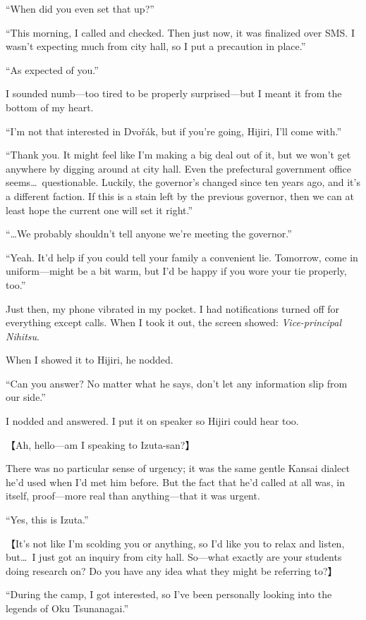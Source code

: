 \documentclass[
    a4paper,
    12pt,
    twoside,
    openany,
    UTF8,
    fontset=windows
]{ctexbook}
\begin{document}
``When did you even set that up?''

``This morning, I called and checked. Then just now, it was finalized over SMS. I wasn't expecting much from city hall, so I put a precaution in place.''

``As expected of you.''

I sounded numb---too tired to be properly surprised---but I meant it from the bottom of my heart.

``I'm not that interested in Dvo\v{r}\'ak, but if you're going, Hijiri, I'll come with.''

``Thank you. It might feel like I'm making a big deal out of it, but we won't get anywhere by digging around at city hall. Even the prefectural government office seems\dots\ questionable. Luckily, the governor's changed since ten years ago, and it's a different faction. If this is a stain left by the previous governor, then we can at least hope the current one will set it right.''

``\dots We probably shouldn't tell anyone we're meeting the governor.''

``Yeah. It'd help if you could tell your family a convenient lie. Tomorrow, come in uniform---might be a bit warm, but I'd be happy if you wore your tie properly, too.''

Just then, my phone vibrated in my pocket. I had notifications turned off for everything except calls. When I took it out, the screen showed: \textit{Vice-principal Nihitsu}.

When I showed it to Hijiri, he nodded.

``Can you answer? No matter what he says, don't let any information slip from our side.''

I nodded and answered. I put it on speaker so Hijiri could hear too.

【Ah, hello---am I speaking to Izuta-san?】

There was no particular sense of urgency; it was the same gentle Kansai dialect he'd used when I'd met him before.
But the fact that he'd called at all was, in itself, proof---more real than anything---that it was urgent.

``Yes, this is Izuta.''

【It's not like I'm scolding you or anything, so I'd like you to relax and listen, but\dots\ I just got an inquiry from city hall. So---what exactly are your students doing research on? Do you have any idea what they might be referring to?】

``During the camp, I got interested, so I've been personally looking into the legends of Oku Tsunanagai.''
\end{document}
